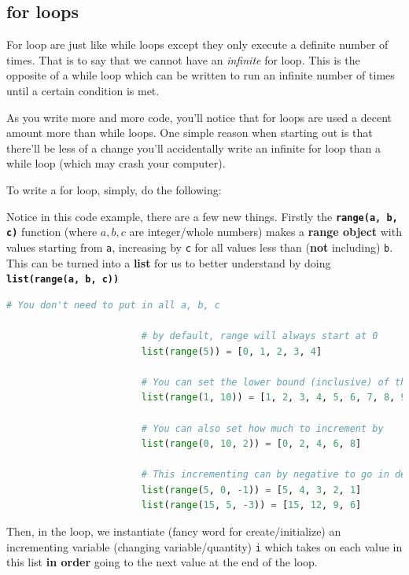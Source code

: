 \documentclass[12pt,a4paper]{book}
\newcommand{\coderef}[1]{Code Ex. \ref{#1}}
\begin{document}
				\subsection{for loops}
					For loop are just like while loops except they only execute a definite number of times. That is to say that we cannot have an \textit{infinite} for loop. This is the opposite of a while loop which can be written to run an infinite number of times until a certain condition is met. 
					
					As you write more and more code, you'll notice that for loops are used a decent amount more than while loops. One simple reason when starting out is that there'll be less of a change you'll accidentally write an infinite for loop than a while loop (which may crash your computer). 
					
					To write a for loop, simply, do the following:
					

					Notice in this code example, there are a few new things. Firstly the \textbf{\texttt{range(a, b, c)}} function (where $a, b, c$ are integer/whole numbers) makes a \textbf{range object} with values starting from \texttt{a}, increasing by \texttt{c} for all values less than (\textbf{not} including) \texttt{b}. This can be turned into a \textbf{list} for us to better understand by doing \textbf{\texttt{list(range(a, b, c))}}
					\begin{lstlisting}[language=python, title={range function}, caption={How the Range function works} label={code-py:range}]
						# You don't need to put in all a, b, c

						# by default, range will always start at 0
						list(range(5)) = [0, 1, 2, 3, 4]

						# You can set the lower bound (inclusive) of the range
						list(range(1, 10)) = [1, 2, 3, 4, 5, 6, 7, 8, 9]

						# You can also set how much to increment by
						list(range(0, 10, 2)) = [0, 2, 4, 6, 8]

						# This incrementing can by negative to go in decending order
						list(range(5, 0, -1)) = [5, 4, 3, 2, 1]
						list(range(15, 5, -3)) = [15, 12, 9, 6]
					\end{lstlisting}
					
					Then, in the loop, we instantiate (fancy word for create/initialize) an incrementing variable (changing variable/quantity) \texttt{i} which takes on each value in this list \textbf{in order} going to the next value at the end of the loop.
					
\end{document}
